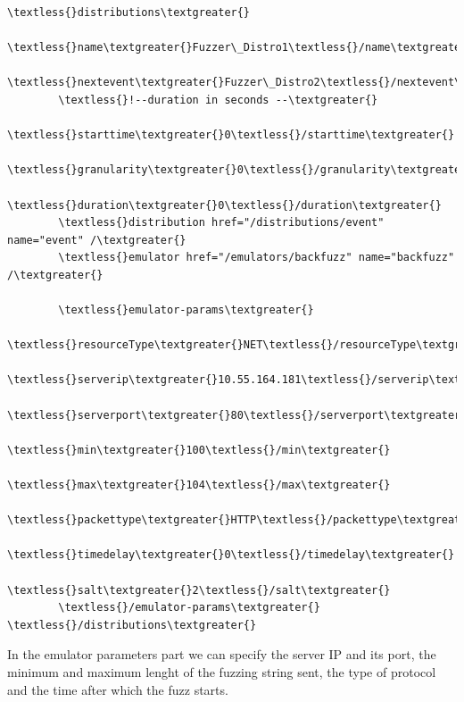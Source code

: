 \documentclass[letterpaper,10pt,english]{sphinxhowto}
\begin{document}
\begin{Verbatim}[commandchars=\\\{\}]
\textless{}distributions\textgreater{}
        \textless{}name\textgreater{}Fuzzer\_Distro1\textless{}/name\textgreater{}
        \textless{}nextevent\textgreater{}Fuzzer\_Distro2\textless{}/nextevent\textgreater{}
        \textless{}!--duration in seconds --\textgreater{}
        \textless{}starttime\textgreater{}0\textless{}/starttime\textgreater{}
        \textless{}granularity\textgreater{}0\textless{}/granularity\textgreater{}
        \textless{}duration\textgreater{}0\textless{}/duration\textgreater{}
        \textless{}distribution href="/distributions/event" name="event" /\textgreater{}
        \textless{}emulator href="/emulators/backfuzz" name="backfuzz" /\textgreater{}

        \textless{}emulator-params\textgreater{}
                \textless{}resourceType\textgreater{}NET\textless{}/resourceType\textgreater{}
                \textless{}serverip\textgreater{}10.55.164.181\textless{}/serverip\textgreater{}
                \textless{}serverport\textgreater{}80\textless{}/serverport\textgreater{}
                \textless{}min\textgreater{}100\textless{}/min\textgreater{}
                \textless{}max\textgreater{}104\textless{}/max\textgreater{}
                \textless{}packettype\textgreater{}HTTP\textless{}/packettype\textgreater{}
                \textless{}timedelay\textgreater{}0\textless{}/timedelay\textgreater{}
                \textless{}salt\textgreater{}2\textless{}/salt\textgreater{}
        \textless{}/emulator-params\textgreater{}
\textless{}/distributions\textgreater{}
\end{Verbatim}

In the emulator parameters part we can specify the server IP and its port, the minimum and maximum lenght of the fuzzing string sent, the type of protocol and the time after which the fuzz starts.
\end{document}
